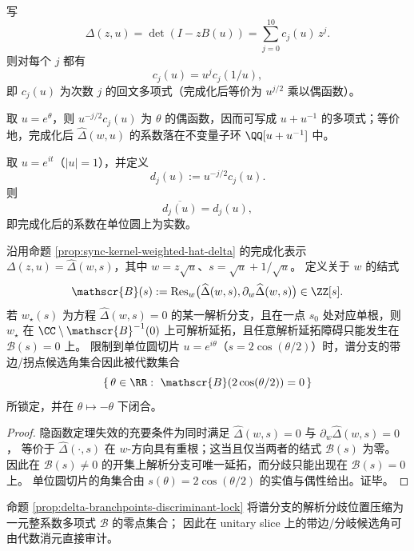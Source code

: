 \begin{corollary}\label{cor:delta-coeff-palindrome}
写
\[
\Delta(z,u)=\det(I-zB(u))=\sum_{j=0}^{10}c_j(u)\,z^j.
\]
则对每个 $j$ 都有
\[
c_j(u)=u^j c_j(1/u),
\]
即 $c_j(u)$ 为次数 $j$ 的回文多项式（完成化后等价为 $u^{j/2}$ 乘以偶函数）。
\end{corollary}

\begin{remark}
取 $u=e^\theta$，则 $u^{-j/2}c_j(u)$ 为 $\theta$ 的偶函数，因而可写成 $u+u^{-1}$ 的多项式；等价地，完成化后 $\widehat{\Delta}(w,u)$ 的系数落在不变量子环 $\QQ[u+u^{-1}]$ 中。
\end{remark}

\begin{corollary}\label{cor:completion-real-line}
取 $u=e^{it}$（$|u|=1$），并定义
\[
d_j(u):=u^{-j/2}c_j(u).
\]
则
\[
\overline{d_j(u)}=d_j(u),
\]
即完成化后的系数在单位圆上为实数。
\end{corollary}

\begin{proposition}\label{prop:delta-branchpoints-discriminant-lock}
沿用命题 \ref{prop:sync-kernel-weighted-hat-delta} 的完成化表示 \(\Delta(z,u)=\widehat\Delta(w,s)\)，其中 \(w=z\sqrt{u}\)、\(s=\sqrt{u}+1/\sqrt{u}\)。
定义关于 \(w\) 的结式
\[
\mathscr{B}(s):=\operatorname{Res}_w\bigl(\widehat\Delta(w,s),\partial_w\widehat\Delta(w,s)\bigr)\in\ZZ[s].
\]
若 \(w_\star(s)\) 为方程 \(\widehat\Delta(w,s)=0\) 的某一解析分支，且在一点 \(s_0\) 处对应单根，则 \(w_\star\) 在 \(\CC\setminus \mathscr{B}^{-1}(0)\) 上可解析延拓，且任意解析延拓障碍只能发生在 \(\mathscr{B}(s)=0\) 上。
限制到单位圆切片 \(u=e^{i\theta}\)（\(s=2\cos(\theta/2)\)）时，谱分支的带边/拐点候选角集合因此被代数集合
\[
\{\,\theta\in\RR:\ \mathscr{B}(2\cos(\theta/2))=0\,\}
\]
所锁定，并在 \(\theta\mapsto-\theta\) 下闭合。
\end{proposition}
\begin{proof}
隐函数定理失效的充要条件为同时满足 \(\widehat\Delta(w,s)=0\) 与 \(\partial_w\widehat\Delta(w,s)=0\)，
等价于 \(\widehat\Delta(\cdot,s)\) 在 \(w\)-方向具有重根；这当且仅当两者的结式 \(\mathscr{B}(s)\) 为零。
因此在 \(\mathscr{B}(s)\neq 0\) 的开集上解析分支可唯一延拓，而分歧只能出现在 \(\mathscr{B}(s)=0\) 上。
单位圆切片的角集合由 \(s(\theta)=2\cos(\theta/2)\) 的实值与偶性给出。证毕。
\end{proof}

\begin{remark}[带边候选角的一元可审计化]\label{rem:discriminant-univariate-audit}
命题 \ref{prop:delta-branchpoints-discriminant-lock} 将谱分支的解析分歧位置压缩为一元整系数多项式 \(\mathscr{B}\) 的零点集合；
因此在 unitary slice 上的带边/分岐候选角可由代数消元直接审计。
\end{remark}
